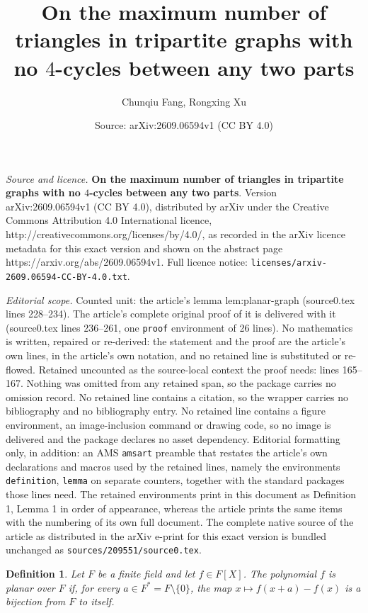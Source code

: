\documentclass[10pt,a4paper]{amsart}
\title{\large{\bfseries On the maximum number of triangles in tripartite graphs with no $4$-cycles between any two parts}}
\author{Chunqiu Fang, Rongxing Xu}
\date{Source: arXiv:2609.06594v1 (CC BY 4.0)}
\newtheorem{definition}{Definition}
\begin{document}
\maketitle

\noindent\emph{Source and licence.} \large{\bfseries On the maximum number of triangles in tripartite graphs with no $4$-cycles between any two parts}. Version arXiv:2609.06594v1 (CC BY 4.0), distributed by arXiv under the Creative Commons Attribution 4.0 International licence, http://creativecommons.org/licenses/by/4.0/, as recorded in the arXiv licence metadata for this exact version and shown on the abstract page https://arxiv.org/abs/2609.06594v1. Full licence notice: \texttt{licenses/arxiv-2609.06594-CC-BY-4.0.txt}.\par\smallskip

\noindent\textit{Editorial scope.} Counted unit: the article's lemma lem:planar-graph (source0.tex lines 228--234). The article's complete original proof of it is delivered with it (source0.tex lines 236--261, one \texttt{proof} environment of 26 lines). No mathematics is written, repaired or re-derived: the statement and the proof are the article's own lines, in the article's own notation, and no retained line is substituted or re-flowed.  Retained uncounted as the source-local context the proof needs: lines 165--167.  Nothing was omitted from any retained span, so the package carries no omission record.  No retained line contains a citation, so the wrapper carries no bibliography and no bibliography entry.  No retained line contains a figure environment, an image-inclusion command or drawing code, so no image is delivered and the package declares no asset dependency.  Editorial formatting only, in addition: an AMS \texttt{amsart} preamble that restates the article's own declarations and macros used by the retained lines, namely the environments \texttt{definition}, \texttt{lemma} on separate counters, together with the standard packages those lines need.  The retained environments print in this document as Definition 1, Lemma 1 in order of appearance, whereas the article prints the same items with the numbering of its own full document.  The complete native source of the article as distributed in the arXiv e-print for this exact version is bundled unchanged as \texttt{sources/209551/source0.tex}.
\begin{definition}\label{def:planar}
Let $F$ be a finite field and let $f\in F[X]$. The polynomial $f$ is \emph{planar over $F$} if, for every $a\in F^*=F\setminus\{0\}$, the map $x\mapsto f(x+a)-f(x)$ is a bijection from $F$ to itself.
\end{definition}
\end{document}
